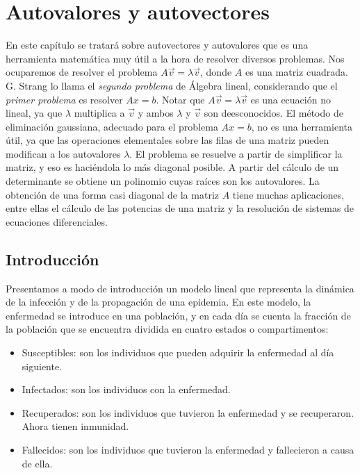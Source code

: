 \chapter{Autovalores y autovectores}
En este capítulo   se tratará sobre autovectores y autovalores que es una herramienta matemática muy útil a la hora de resolver diversos problemas. Nos ocuparemos de resolver el problema $A \vec{v}=\lambda \vec{v}$, donde $A$ es una matriz cuadrada. G. Strang \cite{strang} lo llama el \textit{segundo problema} de Álgebra lineal, considerando que el \textit{primer problema}  es resolver $Ax=b$. Notar que $A\vec{v}=\lambda \vec{v}$ es una ecuación no lineal, ya que $\lambda$ multiplica a $\vec{v}$ y ambos $\lambda$ y $\vec{v}$ son deesconocidos. El método de eliminación gaussiana,    adecuado   para el problema $Ax=b$, no es  una herramienta útil, ya que  las operaciones elementales sobre las filas de una matriz pueden  modifican a los autovalores $\lambda$. El problema  se resuelve  a partir de simplificar la matriz, y eso es haciéndola lo más diagonal posible. A partir  del cálculo de un determinante se obtiene un polinomio cuyas raíces son los autovalores.
La obtención de una forma casi diagonal de la matriz $A$ tiene muchas aplicaciones, entre ellas el cálculo de las potencias de una matriz y la resolución de sistemas de ecuaciones diferenciales.


\lstset{language=Matlab, breaklines=true, basicstyle=\footnotesize}


\bigskip

\section{Introducción}
\label{programa}

Presentamos  a modo de introducción  un modelo lineal que representa   la dinámica de la infección y de la propagación de una epidemia.  En este modelo, la enfermedad se introduce en una población, y en cada día se cuenta la fracción de la población que se encuentra dividida en cuatro estados o compartimentos:

\begin{itemize}
\item

Susceptibles: son los individuos que pueden adquirir la enfermedad al día siguiente.
\item
Infectados: son los individuos con la enfermedad.

\item
Recuperados: son los individuos que tuvieron la enfermedad y se recuperaron. Ahora tienen inmunidad.

\item
Fallecidos: son los individuos que tuvieron la enfermedad y fallecieron a causa de ella.

\end{itemize}


